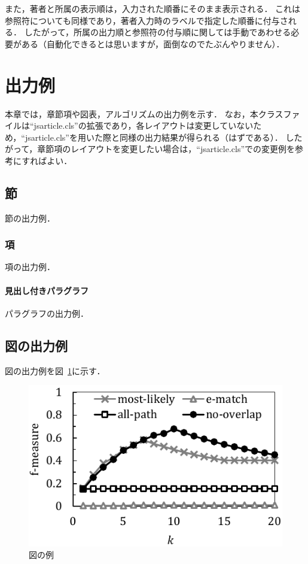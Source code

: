\documentclass{ipsj}
\newcommand{\Fig}[1]{図~#1}
\begin{document}
また，著者と所属の表示順は，入力された順番にそのまま表示される．
これは参照符についても同様であり，著者入力時のラベルで指定した順番に付与される．
したがって，所属の出力順と参照符の付与順に関しては手動であわせる必要がある（自動化できるとは思いますが，面倒なのでたぶんやりません）．


\section{出力例}
本章では，章節項や図表，アルゴリズムの出力例を示す．
なお，本クラスファイルは``jsarticle.cls''の拡張であり，各レイアウトは変更していないため，``jsarticle.cls''を用いた際と同様の出力結果が得られる（はずである）．
したがって，章節項のレイアウトを変更したい場合は，``jsarticle.cls''での変更例を参考にすればよい．

  \subsection{節}
  節の出力例．

    \subsubsection{項}
    項の出力例．

      \paragraph{見出し付きパラグラフ}
      パラグラフの出力例．
  
  \subsection{図の出力例}
  図の出力例を\Fig{\ref{fig:sample}}に示す．
  
    \begin{figure}[t]
    \centering
    \includegraphics[scale=0.80]{./figures/sample_graph.pdf}
    \caption{図の例}
    \label{fig:sample}
    \end{figure}
  
\end{document}
